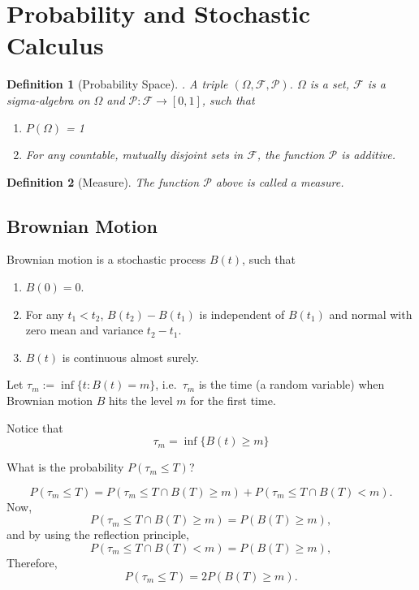 \documentclass{amsart}
\theoremstyle{plain}
\newtheorem{definition}{Definition}
\numberwithin{equation}{section}
\begin{document}
\section{Probability and Stochastic Calculus}

\begin{definition}[Probability Space]. 
A triple $(\Omega, \mathcal{F}, \mathcal{P})$.
$\Omega$ is a set, $\mathcal{F}$ is a sigma-algebra
on $\Omega$ and $\mathcal{P}: \mathcal{F} \to [0, 1]$,
such that 
\begin{enumerate}
	\item $P(\Omega)$ = 1
	\item For any countable, mutually disjoint sets in $\mathcal{F}$, the function $\mathcal{P}$
	is additive.
\end{enumerate}
\end{definition}
\begin{definition}[Measure]
The function $\mathcal{P}$ above is called a measure.
\end{definition}

\subsection*{Brownian Motion}
Brownian motion is a stochastic 
process $B(t)$, such that 
\begin{enumerate}
\item $B(0)=0$.
\item For any $t_1 < t_2$, $B(t_2)-B(t_1)$ is 
independent of $B(t_1)$ and normal with zero mean and 
variance $t_2-t_1$. 
\item $B(t)$ is continuous almost surely.
\end{enumerate}

Let $\tau_m := \inf \{ t: B(t) = m \}$, i.e.\
$\tau_m$ is the time (a random variable)
when Brownian motion $B$ hits the 
level $m$ for the first time.

Notice that 
\begin{equation}
\tau_m = \inf \{ B(t) \geq m\}
\end{equation}

What is the probability $P(\tau_m \leq T)$?

\begin{equation*}
P(\tau_m \leq T) = 
P(\tau_m \leq T \cap B(T) \geq m ) + 
P(\tau_m \leq T \cap B(T) < m ).
\end{equation*}
Now,
\begin{equation}
P(\tau_m \leq T \cap B(T) \geq m ) = P( B(T) \geq m ), 
\end{equation}
and by using the reflection principle,
\begin{equation}
P(\tau_m \leq T \cap B(T) < m ) = P( B(T) \geq m ), 
\end{equation}
Therefore,
\begin{equation}
P(\tau_m \leq T) = 2 P(B(T) \geq m ).
\end{equation}
\end{document}
